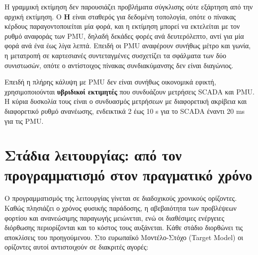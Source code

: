 Η γραμμική εκτίμηση δεν παρουσιάζει προβλήματα σύγκλισης ούτε εξάρτηση από την αρχική
εκτίμηση. Ο $\mathbf{H}$ είναι σταθερός για δεδομένη τοπολογία, οπότε ο πίνακας κέρδους
παραγοντοποιείται μία φορά, και η εκτίμηση μπορεί να εκτελείται με τον ρυθμό αναφοράς των
PMU, δηλαδή δεκάδες φορές ανά δευτερόλεπτο, αντί για μία φορά ανά ένα έως λίγα λεπτά. Επειδή
οι PMU αναφέρουν συνήθως μέτρο και γωνία, η μετατροπή σε καρτεσιανές συντεταγμένες συσχετίζει
τα σφάλματα των δύο συνιστωσών, οπότε ο αντίστοιχος πίνακας συνδιακύμανσης δεν είναι
διαγώνιος.

Επειδή η πλήρης κάλυψη με PMU δεν είναι συνήθως οικονομικά εφικτή, χρησιμοποιούνται
\textbf{υβριδικοί εκτιμητές} που συνδυάζουν μετρήσεις SCADA και PMU. Η κύρια δυσκολία τους
είναι ο συνδυασμός μετρήσεων με διαφορετική ακρίβεια και διαφορετικό ρυθμό ανανέωσης,
ενδεικτικά 2 έως 10 s για το SCADA έναντι 20 ms για τις PMU.

\section{Στάδια λειτουργίας: από τον προγραμματισμό στον πραγματικό χρόνο}

Ο προγραμματισμός της λειτουργίας γίνεται σε διαδοχικούς χρονικούς ορίζοντες. Καθώς
πλησιάζει ο χρόνος φυσικής παράδοσης, η αβεβαιότητα των προβλέψεων φορτίου και ανανεώσιμης
παραγωγής μειώνεται, ενώ οι διαθέσιμες ενέργειες διόρθωσης περιορίζονται και το κόστος τους
αυξάνεται. Κάθε στάδιο διορθώνει τις αποκλίσεις του προηγούμενου. Στο ευρωπαϊκό
Μοντέλο-Στόχο (Target Model) οι ορίζοντες αυτοί αντιστοιχούν σε διακριτές αγορές:

